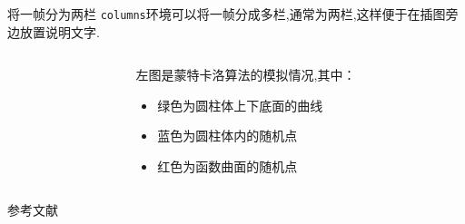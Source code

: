 \documentclass[14pt,hyperref={CJKbookmarks=true}]{beamer} %
\begin{document}
\begin{frame}{将一帧分为两栏}
	\texttt{columns}环境可以将一帧分成多栏,通常为两栏,这样便于在插图旁边放置说明文字.
	\begin{columns}[onlytextwidth]  %
		\begin{column}{0.55\textwidth}
		\end{column}
	\begin{column}{0.45\textwidth}
		左图是蒙特卡洛算法的模拟情况,其中：
		\begin{itemize}
			\item  绿色为圆柱体上下底面的曲线
			\item  蓝色为圆柱体内的随机点
			\item  红色为函数曲面的随机点
		\end{itemize}
	\end{column}
	\end{columns}
\end{frame}
\begin{frame}{参考文献}
\begin{thebibliography}{10}
	
\end{thebibliography}
\end{frame}
\end{document}
